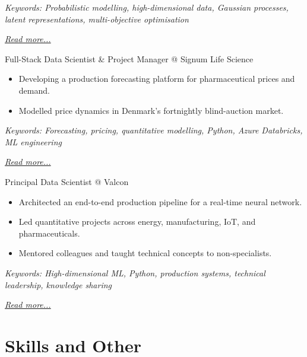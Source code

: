 \documentclass[11pt,a4paper]{moderncv}
\begin{document}
{\footnotesize\textit{Keywords: Probabilistic modelling, high-dimensional data, Gaussian processes, latent representations, multi-objective optimisation}}

\hfill{\small{\textit{\hyperref[sec:raysearch]{Read more...}}}}

\large{Full-Stack Data Scientist \& Project Manager @ Signum Life Science}
\normalsize
\begin{itemize}
    \item Developing a production forecasting platform for pharmaceutical prices and demand.
    \item Modelled price dynamics in Denmark's fortnightly blind-auction market.
\end{itemize}

{\footnotesize\textit{Keywords: Forecasting, pricing, quantitative modelling, Python, Azure Databricks, ML engineering}}

\hfill{\small{\textit{\hyperref[sec:signum]{Read more...}}}}

\large{Principal Data Scientist @ Valcon}
\normalsize
\begin{itemize}
    \item Architected an end-to-end production pipeline for a real-time neural network.
    \item Led quantitative projects across energy, manufacturing, IoT, and pharmaceuticals.
    \item Mentored colleagues and taught technical concepts to non-specialists.
\end{itemize}

{\footnotesize\textit{Keywords: High-dimensional ML, Python, production systems, technical leadership, knowledge sharing}}

\hfill{\small{\textit{\hyperref[sec:valcon]{Read more...}}}}

\section{Skills and Other}
\normalsize
{}

\newpage

\end{document}
